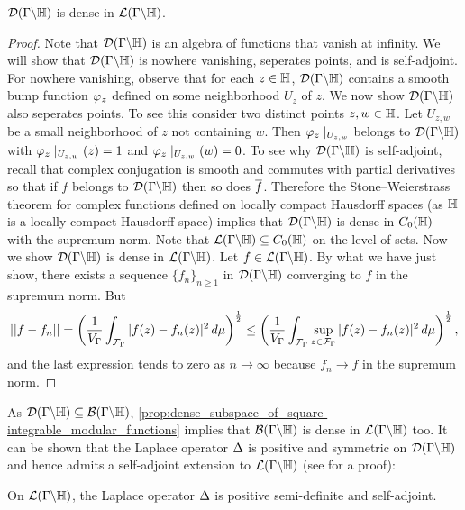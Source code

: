       \begin{proposition}\label{prop:dense_subspace_of_square-integrable_modular_functions}
        $\mathcal{D}(\Gamma\backslash\mathbb{H})$ is dense in $\mathcal{L}(\Gamma\backslash\mathbb{H})$.
      \end{proposition}
      \begin{proof}
        Note that $\mathcal{D}(\Gamma\backslash\mathbb{H})$ is an algebra of functions that vanish at infinity. We will show that $\mathcal{D}(\Gamma\backslash\mathbb{H})$ is nowhere vanishing, seperates points, and is self-adjoint. For nowhere vanishing, observe that for each $z \in \mathbb{H}$, $\mathcal{D}(\Gamma\backslash\mathbb{H})$ contains a smooth bump function $\varphi_{z}$ defined on some neighborhood $U_{z}$ of $z$. We now show $\mathcal{D}(\Gamma\backslash\mathbb{H})$ also seperates points. To see this consider two distinct points $z,w \in \mathbb{H}$. Let $U_{z,w}$ be a small neighborhood of $z$ not containing $w$. Then $\varphi_{z}\mid_{U_{z,w}}$ belongs to $\mathcal{D}(\Gamma\backslash\mathbb{H})$ with $\varphi_{z}\mid_{U_{z,w}}(z) = 1$ and $\varphi_{z}\mid_{U_{z,w}}(w) = 0$. To see why $\mathcal{D}(\Gamma\backslash\mathbb{H})$ is self-adjoint, recall that complex conjugation is smooth and commutes with partial derivatives so that if $f$ belongs to $\mathcal{D}(\Gamma\backslash\mathbb{H})$ then so does $\overline{f}$. Therefore the Stone–Weierstrass theorem for complex functions defined on locally compact Hausdorff spaces (as $\mathbb{H}$ is a locally compact Hausdorff space) implies that $\mathcal{D}(\Gamma\backslash\mathbb{H})$ is dense in $C_{0}(\mathbb{H})$ with the supremum norm. Note that $\mathcal{L}(\Gamma\backslash\mathbb{H}) \subseteq C_{0}(\mathbb{H})$ on the level of sets. Now we show $\mathcal{D}(\Gamma\backslash\mathbb{H})$ is dense in $\mathcal{L}(\Gamma\backslash\mathbb{H})$. Let $f \in \mathcal{L}(\Gamma\backslash\mathbb{H})$. By what we have just show, there exists a sequence $\{f_{n}\}_{n \ge 1}$ in $\mathcal{D}(\Gamma\backslash\mathbb{H})$ converging to $f$ in the supremum norm. But 
        \[
        ||f-f_{n}|| = \left(\frac{1}{V_{\Gamma}}\int_{\mathcal{F}_{\Gamma}}|f(z)-f_{n}(z)|^{2}\,d\mu\right)^{\frac{1}{2}} \le \left(\frac{1}{V_{\Gamma}}\int_{\mathcal{F}_{\Gamma}}\sup_{z \in \mathcal{F}_{\Gamma}}|f(z)-f_{n}(z)|^{2}\,d\mu\right)^{\frac{1}{2}},
        \]
        and the last expression tends to zero as $n \to \infty$ because $f_{n} \to f$ in the supremum norm.
      \end{proof}

      As $\mathcal{D}(\Gamma\backslash\mathbb{H}) \subseteq \mathcal{B}(\Gamma\backslash\mathbb{H})$, \cref{prop:dense_subspace_of_square-integrable_modular_functions} implies that $\mathcal{B}(\Gamma\backslash\mathbb{H})$ is dense in $\mathcal{L}(\Gamma\backslash\mathbb{H})$ too. It can be shown that the Laplace operator $\Delta$ is positive and symmetric on $\mathcal{D}(\Gamma\backslash\mathbb{H})$ and hence admits a self-adjoint extension to $\mathcal{L}(\Gamma\backslash\mathbb{H})$ (see \cite{iwaniec2021spectral} for a proof):

      \begin{theorem}\label{thm:Laplace_semi-definite_self-adjoint}
        On $\mathcal{L}(\Gamma\backslash\mathbb{H})$, the Laplace operator $\Delta$ is positive semi-definite and self-adjoint.
      \end{theorem}

